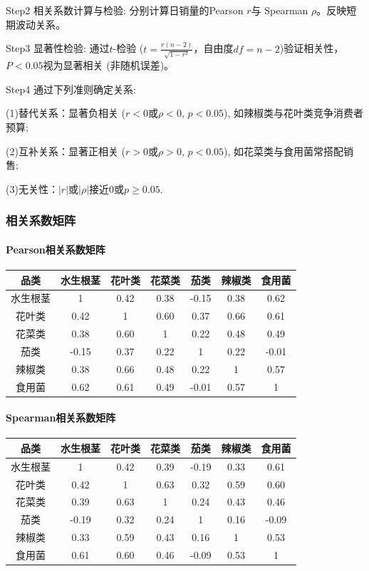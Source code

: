 \documentclass{cumcmthesis}
\begin{document}
    Step2 相关系数计算与检验: 分别计算日销量的Pearson $r$与
    Spearman $\rho$。反映短期波动关系。 
    
    Step3 显著性检验: 通过$t$-检验 
    ($t=\frac{r(n-2)}{\sqrt{1-r^2}}$，自由度$df=n-2$)验证相关性，
    $P<0.05$视为显著相关 (非随机误差)。
    
    Step4 通过下列准则确定关系: 
   
    (1)替代关系：显著负相关 ($r<0$或$\rho<0$, $p<0.05$), 如辣椒类与花叶类竞争消费者预算; 

    (2)互补关系：显著正相关 ($r>0$或$\rho>0$, $p<0.05$), 如花菜类与食用菌常搭配销售;  

    (3)无关性：$|r|$或$|\rho|$接近0或$p≥0.05$.


\subsubsection{相关系数矩阵} 
\paragraph{Pearson相关系数矩阵}
\begin{table}[H]
\centering
\begin{tabular}{c c c c c c c}
\toprule
品类 & 水生根茎 & 花叶类 & 花菜类 & 茄类 & 辣椒类 & 食用菌 \\
\midrule
水生根茎 & 1 & 0.42 & 0.38 & -0.15 & 0.38 & 0.62 \\
花叶类 & 0.42 & 1 & 0.60 & 0.37 & 0.66 & 0.61 \\
花菜类 & 0.38 & 0.60 & 1 & 0.22 & 0.48 & 0.49 \\
茄类 & -0.15 & 0.37 & 0.22 & 1 & 0.22 & -0.01 \\
辣椒类 & 0.38 & 0.66 & 0.48 & 0.22 & 1 & 0.57 \\
食用菌 & 0.62 & 0.61 & 0.49 & -0.01 & 0.57 & 1 \\
\bottomrule
\end{tabular}
\end{table}

\paragraph{Spearman相关系数矩阵}
\begin{table}[H]
\centering
\begin{tabular}{c c c c c c c}
\toprule
品类 & 水生根茎 & 花叶类 & 花菜类 & 茄类 & 辣椒类 & 食用菌 \\
\midrule
水生根茎 & 1 & 0.42 & 0.39 & -0.19 & 0.33 & 0.61 \\
花叶类 & 0.42 & 1 & 0.63 & 0.32 & 0.59 & 0.60 \\
花菜类 & 0.39 & 0.63 & 1 & 0.24 & 0.43 & 0.46 \\
茄类 & -0.19 & 0.32 & 0.24 & 1 & 0.16 & -0.09 \\
辣椒类 & 0.33 & 0.59 & 0.43 & 0.16 & 1 & 0.53 \\
食用菌 & 0.61 & 0.60 & 0.46 & -0.09 & 0.53 & 1 \\
\bottomrule
\end{tabular}
\end{table}
\end{document}

